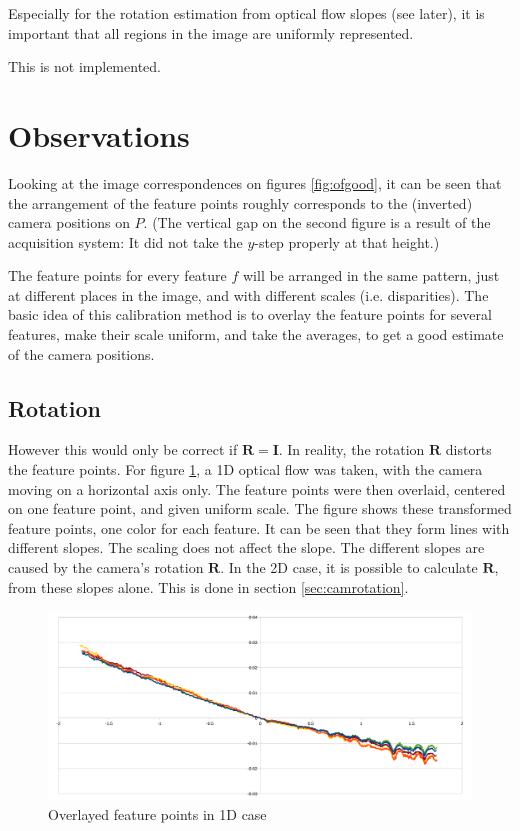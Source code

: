 \documentclass{scrreprt}
\newcommand{\matr}[1]{\mathbf{#1}}
\begin{document}
Especially for the rotation estimation from optical flow slopes (see later), it is important that all regions in the image are uniformly represented.

This is not implemented.

\pagebreak
\section{Observations}
Looking at the image correspondences on figures \ref{fig:ofgood}, it can be seen that the arrangement of the feature points roughly corresponds to the (inverted) camera positions on $P$. (The vertical gap on the second figure is a result of the acquisition system: It did not take the $y$-step properly at that height.) 

The feature points for every feature $f$ will be arranged in the same pattern, just at different places in the image, and with different scales (i.e. disparities). The basic idea of this calibration method is to overlay the feature points for several features, make their scale uniform, and take the averages, to get a good estimate of the camera positions.


\subsection{Rotation}
However this would only be correct if $\matr{R} = \matr{I}$. In reality, the rotation $\matr{R}$ distorts the feature points. For figure \ref{fig:onedimslopes}, a 1D optical flow was taken, with the camera moving on a horizontal axis only. The feature points were then overlaid, centered on one feature point, and given uniform scale. The figure shows these transformed feature points, one color for each feature. It can be seen that they form lines with different slopes. The scaling does not affect the slope. The different slopes are caused by the camera's rotation $\matr{R}$. In the 2D case, it is possible to calculate $\matr{R}$, from these slopes alone. This is done in section \ref{sec:camrotation}.

\begin{figure}[h]
\centering
\includegraphics[width=\textwidth]{onedimslopes.pdf}
\caption{Overlayed feature points in 1D case}
\label{fig:onedimslopes}
\end{figure}
\end{document}
